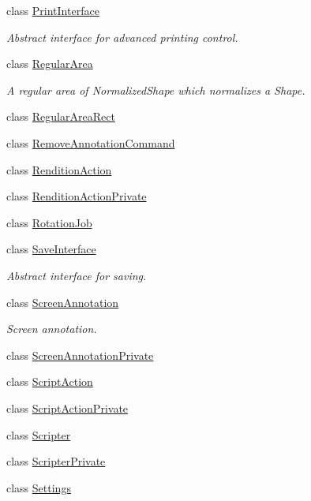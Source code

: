 \begin{DoxyCompactItemize}
\item 
class \hyperlink{classOkular_1_1PrintInterface}{Print\+Interface}
\begin{DoxyCompactList}\small\item\em Abstract interface for advanced printing control. \end{DoxyCompactList}\item 
class \hyperlink{classOkular_1_1RegularArea}{Regular\+Area}
\begin{DoxyCompactList}\small\item\em A regular area of Normalized\+Shape which normalizes a Shape. \end{DoxyCompactList}\item 
class \hyperlink{classOkular_1_1RegularAreaRect}{Regular\+Area\+Rect}
\item 
class \hyperlink{classOkular_1_1RemoveAnnotationCommand}{Remove\+Annotation\+Command}
\item 
class \hyperlink{classOkular_1_1RenditionAction}{Rendition\+Action}
\item 
class \hyperlink{classOkular_1_1RenditionActionPrivate}{Rendition\+Action\+Private}
\item 
class \hyperlink{classOkular_1_1RotationJob}{Rotation\+Job}
\item 
class \hyperlink{classOkular_1_1SaveInterface}{Save\+Interface}
\begin{DoxyCompactList}\small\item\em Abstract interface for saving. \end{DoxyCompactList}\item 
class \hyperlink{classOkular_1_1ScreenAnnotation}{Screen\+Annotation}
\begin{DoxyCompactList}\small\item\em Screen annotation. \end{DoxyCompactList}\item 
class \hyperlink{classOkular_1_1ScreenAnnotationPrivate}{Screen\+Annotation\+Private}
\item 
class \hyperlink{classOkular_1_1ScriptAction}{Script\+Action}
\item 
class \hyperlink{classOkular_1_1ScriptActionPrivate}{Script\+Action\+Private}
\item 
class \hyperlink{classOkular_1_1Scripter}{Scripter}
\item 
class \hyperlink{classOkular_1_1ScripterPrivate}{Scripter\+Private}
\item 
class \hyperlink{classOkular_1_1Settings}{Settings}

\end{DoxyCompactItemize}
